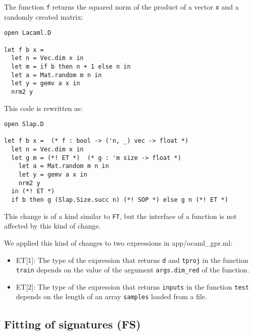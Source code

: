 \documentclass[10pt,a4paper]{article}
\begin{document}
The function \lstinline|f| returns the squared norm of the product of a vector
\lstinline|x| and a randomly created matrix:
\begin{lstlisting}
open Lacaml.D

let f b x =
  let n = Vec.dim x in
  let m = if b then n + 1 else n in
  let a = Mat.random m n in
  let y = gemv a x in
  nrm2 y
\end{lstlisting}
This code is rewritten as:
\begin{lstlisting}
open Slap.D

let f b x =  (* f : bool -> ('n, _) vec -> float *)
  let n = Vec.dim x in
  let g m = (*! ET *)  (* g : 'm size -> float *)
    let a = Mat.random m n in
    let y = gemv a x in
    nrm2 y
  in (*! ET *)
  if b then g (Slap.Size.succ n) (*! SOP *) else g n (*! ET *)
\end{lstlisting}
This change is of a kind similar to \lstinline|FT|, but the interface of a function is not
affected by this kind of change.

We applied this kind of changes to two expressions in app/ocaml\_gpr.ml:
\begin{itemize}
\item ET[1]: The type of the expression that returns \lstinline|d| and \lstinline|tproj|
  in the function \lstinline|train| depends on the value of the argument
  \lstinline|args.dim_red| of the function.
\item ET[2]: The type of the expression that returns \lstinline|inputs| in the function
   \lstinline|test| depends on the length of an array \lstinline|samples| loaded
   from a file.
\end{itemize}

\subsection{Fitting of signatures (FS)}
\label{sec:FS}
\end{document}
